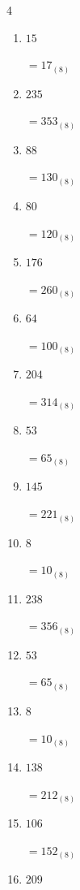 \begin{multicols}{4}
\begin{enumerate}
        $=70_{(8)}$

\columnbreak %

  \item $15$

        $=17_{(8)}$

  \item $235$

        $=353_{(8)}$

  \item $88$

        $=130_{(8)}$

  \item $80$

        $=120_{(8)}$

  \item $176$

        $=260_{(8)}$

  \item $64$

        $=100_{(8)}$

  \item $204$

        $=314_{(8)}$

  \item $53$

        $=65_{(8)}$

  \item $145$

        $=221_{(8)}$

  \item $8$

        $=10_{(8)}$

  \item $238$

        $=356_{(8)}$

  \item $53$

        $=65_{(8)}$

  \item $8$

        $=10_{(8)}$

  \item $138$

        $=212_{(8)}$

  \item $106$

        $=152_{(8)}$

\columnbreak %

  \item $209$


\end{enumerate}
\end{multicols}
